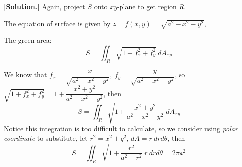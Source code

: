 \documentclass[11pt, a4paper]{MATH2023}
\newcommand{\sol}{\textbf{[Solution.] }}
\begin{document}
\begin{spacing}{1.3}
    \sol Again, project $S$ onto $xy$-plane to get region $R$.

    The equation of surface is given by $z=f(x,y)=\sqrt{a^2-x^2-y^2}$,
    
    The green area: $$S=\iint_R\sqrt{1+f_x^2+f_y^2}\ dA_{xy}$$

    We know that $f_x=\dfrac{-x}{\sqrt{a^2-x^2-y^2}},\ f_y=\dfrac{-y}{\sqrt{a^2-x^2-y^2}}$, so 
    $\sqrt{1+f_x^2+f_y^2}=1+\dfrac{x^2+y^2}{a^2-x^2-y^2}$, then
    $$S = \iint_R \sqrt{1+\dfrac{x^2+y^2}{a^2-x^2-y^2}}\ dA_{xy}$$
    Notice this integration is too difficult to calculate, so we consider using {\it polar coordinate}
    to substitute, let $r^2=x^2+y^2$, $dA=r\ drd\theta$, then 
    $$S = \iint_R \sqrt{1+\dfrac{r^2}{a^2-r^2}}\ r\ drd\theta=2\pi a^2$$

\end{spacing}
\end{document}
